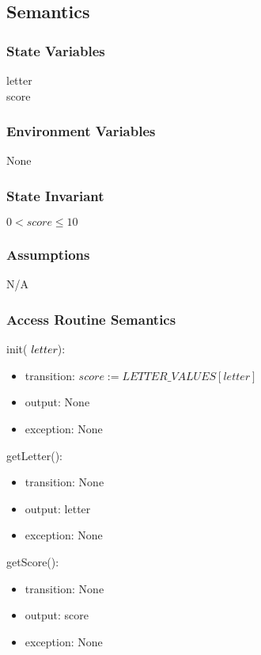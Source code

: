\documentclass[12pt]{article}
\begin{document}
\subsection* {Semantics}

\subsubsection* {State Variables}
letter \\
score \\
\subsubsection* {Environment Variables}
None
\subsubsection* {State Invariant}
$0 < score \leq 10$
\subsubsection* {Assumptions}

N/A

\begin{itemize}

\end{itemize}

\subsubsection* {Access Routine Semantics}

\noindent init(\textcolor{black}{ $letter$}):
\begin{itemize}
\item transition: $score := LETTER\_VALUES[letter]$ 
\item output: None
\item exception: None
\end{itemize}

\noindent getLetter():
\begin{itemize}
\item transition: None
\item output: letter
\item exception: None
\end{itemize}

\noindent getScore():
\begin{itemize}
\item transition: None
\item output: score
\item exception: None
\end{itemize}
\end{document}
